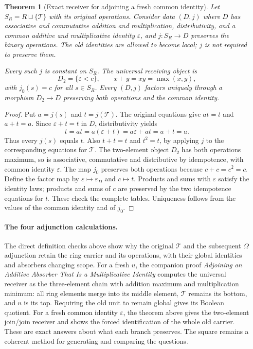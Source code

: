 \documentclass[11pt]{article}
\newtheorem{theorem}{Theorem}
\begin{document}
\begin{theorem}[Exact receiver for adjoining a fresh common identity]
Let $S_R=R\sqcup\{\mathcal T\}$ with its original operations. Consider data $(D,j)$ where $D$ has associative and commutative addition and multiplication, distributivity, and a common additive and multiplicative identity $\varepsilon$, and $j:S_R\to D$ preserves the binary operations. The old identities are allowed to become local; $j$ is not required to preserve them.

Every such $j$ is constant on $S_R$. The universal receiving object is
\[
D_2=\{\varepsilon<c\},\qquad x+y=xy=\max(x,y),
\]
with $j_0(s)=c$ for all $s\in S_R$. Every $(D,j)$ factors uniquely through a morphism $D_2\to D$ preserving both operations and the common identity.
\end{theorem}
\begin{proof}
Put $a=j(s)$ and $t=j(\mathcal T)$. The original equations give $at=t$ and $a+t=a$. Since $\varepsilon+t=t$ in $D$, distributivity yields
\[
t=at=a(\varepsilon+t)=a\varepsilon+at=a+t=a.
\]
Thus every $j(s)$ equals $t$. Also $t+t=t$ and $t^2=t$, by applying $j$ to the corresponding equations for $\mathcal T$. The two-element object $D_2$ has both operations maximum, so is associative, commutative and distributive by idempotence, with common identity $\varepsilon$. The map $j_0$ preserves both operations because $c+c=c^2=c$. Define the factor map by $\varepsilon\mapsto\varepsilon_D$ and $c\mapsto t$. Products and sums with $\varepsilon$ satisfy the identity laws; products and sums of $c$ are preserved by the two idempotence equations for $t$. These check the complete tables. Uniqueness follows from the values of the common identity and of $j_0$.
\end{proof}

\paragraph{The four adjunction calculations.}
The direct definition checks above show why the original $\mathcal T$ and the subsequent $\Omega$ adjunction retain the ring carrier and its operations, with their global identities and absorbers changing scope. For a fresh $u$, the companion proof \emph{Adjoining an Additive Absorber That Is a Multiplicative Identity} computes the universal receiver as the three-element chain with addition maximum and multiplication minimum: all ring elements merge into its middle element, $\mathcal T$ remains its bottom, and $u$ is its top. Requiring the old unit to remain global gives its Boolean quotient. For a fresh common identity $\varepsilon$, the theorem above gives the two-element join/join receiver and shows the forced identification of the whole old carrier. These are exact answers about what each branch preserves. The square remains a coherent method for generating and comparing the questions.
\end{document}
